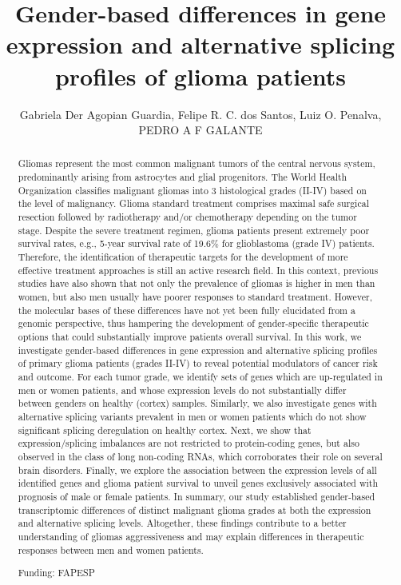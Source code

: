 \documentclass[twoside]{article}
\title{\vspace{-15mm}\fontsize{24pt}{10pt}\selectfont\textbf{ Gender-based differences in gene expression and alternative splicing profiles of glioma patients }} %
\author{ Gabriela Der Agopian Guardia, Felipe R. C. dos Santos, Luiz O. Penalva, PEDRO A F GALANTE }
\affil{ Children’s Cancer Research Institute,  UT Health San Antonio,  San Antonio,  Texas,  USA }
\date{}
\begin{document}
  
  
  \maketitle %
  
  
  \thispagestyle{fancy} %
  
  
  \begin{abstract}
  Gliomas represent the most common malignant tumors of the central nervous system,  predominantly arising from astrocytes and glial progenitors. The World Health Organization classifies malignant gliomas into 3 histological grades (II-IV) based on the level of malignancy. Glioma standard treatment comprises maximal safe surgical resection followed by radiotherapy and/or chemotherapy depending on the tumor stage. Despite the severe treatment regimen,  glioma patients present extremely poor survival rates,  e.g.,  5-year survival rate of 19.6\% for glioblastoma (grade IV) patients. Therefore,  the identification of therapeutic targets for the development of more effective treatment approaches is still an active research field. In this context,  previous studies have also shown that not only the prevalence of gliomas is higher in men than women,  but also men usually have poorer responses to standard treatment. However,  the molecular bases of these differences have not yet been fully elucidated from a genomic perspective,  thus hampering the development of gender-specific therapeutic options that could substantially improve patients overall survival. In this work,  we investigate gender-based differences in gene expression and alternative splicing profiles of primary glioma patients (grades II-IV) to reveal potential modulators of cancer risk and outcome. For each tumor grade,  we identify sets of genes which are up-regulated in men or women patients,  and whose expression levels do not substantially differ between genders on healthy (cortex) samples. Similarly,  we also investigate genes with alternative splicing variants prevalent in men or women patients which do not show significant splicing deregulation on healthy cortex. Next,  we show that expression/splicing imbalances are not restricted to protein-coding genes,  but also observed in the class of long non-coding RNAs,  which corroborates their role on several brain disorders. Finally,  we explore the association between the expression levels of all identified genes and glioma patient survival to unveil genes exclusively associated with prognosis of male or female patients. In summary,  our study established gender-based transcriptomic differences of distinct malignant glioma grades at both the expression and alternative splicing levels. Altogether,  these findings contribute to a better understanding of gliomas aggressiveness and may explain differences in therapeutic responses between men and women patients.
  
  Funding: FAPESP \\ 
  \end{abstract}
  
\end{document}

